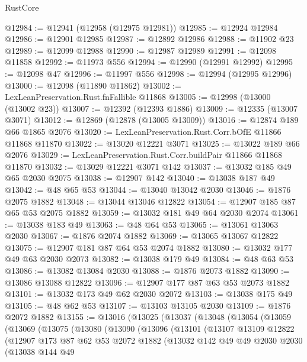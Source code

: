 \begin{lexlean}{RustCore}
\begin{coremodule}
@12984 := @12941 (@12958 (@12975 @12981))
@12985 := @12924 @12984
@12986 := @12901 @12985
@12987 := @12892 @12986
@12988 := @11902 @23
@12989 := @12099 @12988
@12990 := @12987 @12989
@12991 := @12098 @11858
@12992 := @11973 @556
@12994 := @12990 (@12991 @12992)
@12995 := @12098 @47
@12996 := @11997 @556
@12998 := @12994 (@12995 @12996)
@13000 := @12098 (@11890 @11862)
@13002 := LexLeanPreservation.Rust.fnFallible @11868
@13005 := @12998 (@13000 (@13002 @23))
@13007 := @12392 (@12393 @1886)
@13009 := @12335 (@13007 @3071)
@13012 := @12869 (@12878 (@13005 @13009))
@13016 := @12874 @189 @66 @1865 @2076
@13020 := LexLeanPreservation.Rust.Corr.bOfE @11866 @11868 @11870
@13022 := @13020 @12221 @3071
@13025 := @13022 @189 @66 @2076
@13029 := LexLeanPreservation.Rust.Corr.buildPair @11866 @11868 @11870
@13032 := @13029 @12221 @3071 @142
@13037 := @13032 @185 @49 @65 @2030 @2075
@13038 := @12907 @142
@13040 := @13038 @187 @49
@13042 := @48 @65 @53
@13044 := @13040 @13042 @2030
@13046 := @1876 @2075 @1882
@13048 := @13044 @13046 @12822
@13054 := @12907 @185 @87 @65 @53 @2075 @1882
@13059 := @13032 @181 @49 @64 @2030 @2074
@13061 := @13038 @183 @49
@13063 := @48 @64 @53
@13065 := @13061 @13063 @2030
@13067 := @1876 @2074 @1882
@13069 := @13065 @13067 @12822
@13075 := @12907 @181 @87 @64 @53 @2074 @1882
@13080 := @13032 @177 @49 @63 @2030 @2073
@13082 := @13038 @179 @49
@13084 := @48 @63 @53
@13086 := @13082 @13084 @2030
@13088 := @1876 @2073 @1882
@13090 := @13086 @13088 @12822
@13096 := @12907 @177 @87 @63 @53 @2073 @1882
@13101 := @13032 @173 @49 @62 @2030 @2072
@13103 := @13038 @175 @49
@13105 := @48 @62 @53
@13107 := @13103 @13105 @2030
@13109 := @1876 @2072 @1882
@13155 := @13016
    (@13025
      (@13037
        (@13048
          (@13054
            (@13059
              (@13069
                (@13075
                  (@13080
                    (@13090
                      (@13096
                        (@13101
                          (@13107
                            @13109
                            @12822
                            (@12907
                              @173
                              @87
                              @62
                              @53
                              @2072
                              @1882
                              (@13032
                                @142
                                @49
                                @49
                                @2030
                                @2030
                                (@13038
                                  @144
                                  @49

\end{coremodule}
\end{lexlean}
